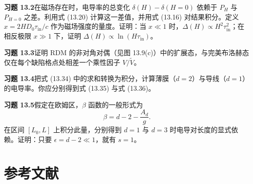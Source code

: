 \textbf{习题 13.2}\quad 在磁场存在时，电导率的总变化 $\delta(H)-\delta(H=0)$ 依赖于 $P_{H}$ 与 $P_{H=0}$ 之差。利用式 (13.20) 计算这一差值，并用式 (13.16) 对结果积分。定义 $x=2HD_{0}\tau_{\mathrm{in}}/c$ 作为磁场强度的量度。证明：当 $x\ll 1$ 时，$\Delta(H)\propto H^{2}\tau_{\mathrm{in}}^{2}$；在相反极限 $x\gg 1$ 下，证明 $\Delta(H)\propto\ln(H\tau_{\mathrm{in}})$。

\textbf{习题 13.3}\quad 证明 RDM 的非对角对偶（见图 13.9(c)）中的扩展态，与完美布洛赫态仅在每个缺陷格点处相差一个乘性因子 $V/\tilde{V}$。

\textbf{习题 13.4}\quad 把式 (13.34) 中的求和转换为积分，计算薄膜（$d=2$）与导线（$d=1$）的电导率。你应分别得到式 (13.35) 与式 (13.36)。

\textbf{习题 13.5}\quad 假定在欧姆区，$\beta$ 函数的一般形式为
\begin{equation*}
\beta=d-2-\frac{A_{d}}{g}.\tag{13.48}
\end{equation*}
在区间 $[L_{0},L]$ 上积分此量，分别得到 $d=1$ 与 $d=3$ 时电导对长度的显式依赖。证明：只要 $\epsilon=d-2\ll 1$，就有 $s=1$。

\section*{参考文献}

